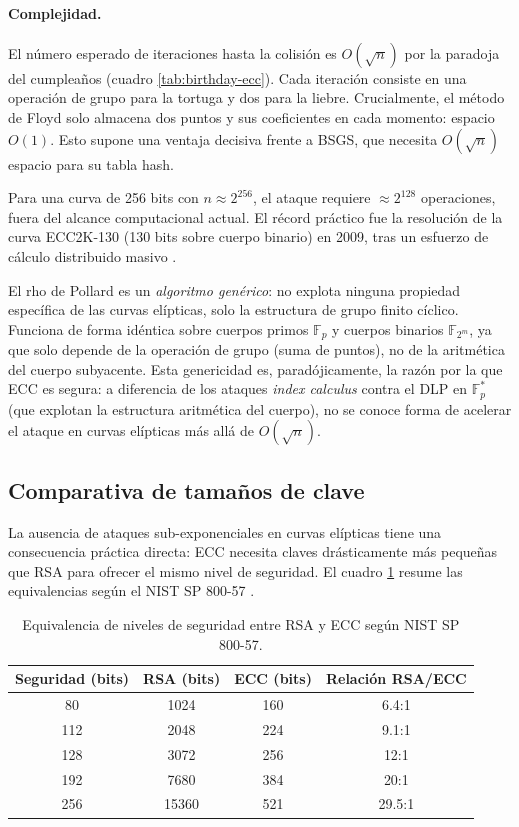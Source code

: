 \paragraph{Complejidad.}
El número esperado de iteraciones hasta la colisión es $O(\sqrt{n})$ por la paradoja del cumpleaños (cuadro \ref{tab:birthday-ecc}). Cada iteración consiste en una operación de grupo para la tortuga y dos para la liebre. Crucialmente, el método de Floyd solo almacena dos puntos y sus coeficientes en cada momento: espacio $O(1)$. Esto supone una ventaja decisiva frente a BSGS, que necesita $O(\sqrt{n})$ espacio para su tabla hash.

Para una curva de 256 bits con $n \approx 2^{256}$, el ataque requiere $\approx 2^{128}$ operaciones, fuera del alcance computacional actual. El récord práctico fue la resolución de la curva ECC2K-130 (130 bits sobre cuerpo binario) en 2009, tras un esfuerzo de cálculo distribuido masivo \cite{gaudry2007breaking}.

\begin{observacion}
    El rho de Pollard es un \emph{algoritmo genérico}: no explota ninguna propiedad específica de las curvas elípticas, solo la estructura de grupo finito cíclico. Funciona de forma idéntica sobre cuerpos primos $\mathbb{F}_p$ y cuerpos binarios $\mathbb{F}_{2^m}$, ya que solo depende de la operación de grupo (suma de puntos), no de la aritmética del cuerpo subyacente. Esta genericidad es, paradójicamente, la razón por la que ECC es segura: a diferencia de los ataques \textit{index calculus} contra el DLP en $\mathbb{F}_p^*$ (que explotan la estructura aritmética del cuerpo), no se conoce forma de acelerar el ataque en curvas elípticas más allá de $O(\sqrt{n})$.
\end{observacion}

\subsection{Comparativa de tamaños de clave}
\label{subsec:ecc-comparativa-claves}

La ausencia de ataques sub-exponenciales en curvas elípticas tiene una consecuencia práctica directa: ECC necesita claves drásticamente más pequeñas que RSA para ofrecer el mismo nivel de seguridad. El cuadro \ref{tab:ecc-rsa-equiv} resume las equivalencias según el NIST SP 800-57 \cite{nist-sp800-57}.

\begin{table}[htbp]
\centering
\begin{tabular}{cccc}
\hline
\textbf{Seguridad (bits)} & \textbf{RSA (bits)} & \textbf{ECC (bits)} & \textbf{Relación RSA/ECC} \\
\hline
80  & 1024  & 160 & 6.4:1 \\
112 & 2048  & 224 & 9.1:1 \\
128 & 3072  & 256 & 12:1 \\
192 & 7680  & 384 & 20:1 \\
256 & 15360 & 521 & 29.5:1 \\
\hline
\end{tabular}
\caption{Equivalencia de niveles de seguridad entre RSA y ECC según NIST SP 800-57.}
\label{tab:ecc-rsa-equiv}
\end{table}

